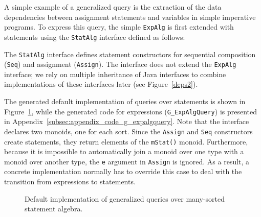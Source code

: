A simple example of a generalized query is the extraction of the data
dependencies between assignment statements and variables in simple
imperative programs.  To express this query, the simple
\lstinline{ExpAlg} is first extended with statements using the
\lstinline{StatAlg} interface defined as follows:



The \lstinline{StatAlg} interface defines  statement constructors for sequential composition
(\lstinline{Seq}) and assignment (\lstinline{Assign}). The interface does not extend the \lstinline{ExpAlg} interface; we rely on multiple inheritance of Java interfaces to combine implementations of these interfaces later (see Figure~\ref{deps2}). 

The generated
default implementation of queries over statements is shown in
Figure~\ref{LST:gstatquery}, while the generated code for expressions (\lstinline{G_ExpAlgQuery}) is
presented in Appendix~\ref{subsec:appendix_code_g_expalgquery}.  Note that the interface declares two
monoids, one for each sort.  Since the \lstinline{Assign} and
\lstinline{Seq} constructors create statements, they return elements
of the \lstinline{mStat()} monoid.  Furthermore, because it is
impossible to automatically join a monoid over one type with a monoid
over another type, the \lstinline{e} argument in \lstinline{Assign}
is ignored.  As a result, a
concrete implementation normally has to override this case to deal with the
transition from expressions to statements.

\begin{figure}[t]
\nocaptionrule
\caption{Default implementation of generalized queries over many-sorted statement algebra.}
\label{LST:gstatquery}
\end{figure}


